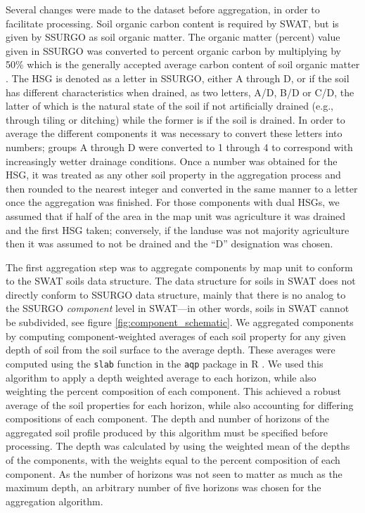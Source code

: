 Several changes were made to the dataset before aggregation, in order to
facilitate processing. Soil organic carbon content is required by SWAT, but is
given by SSURGO as soil organic matter. The organic matter (percent) value given in SSURGO
was converted to percent organic carbon by multiplying by 50\% which is the generally accepted average carbon content of soil organic matter \citep{brady_elements_2004}. The HSG is
denoted as a letter in SSURGO, either A through D, or if the soil has different
characteristics when drained, as two letters, A/D, B/D or C/D, the latter of
which is the natural state of the soil if not artificially drained (e.g.,
through tiling or ditching) while the former is if the soil is drained. In order
to average the different components it was necessary to convert these letters
into numbers; groups A through D were converted to 1 through 4 to correspond
with increasingly wetter drainage conditions. Once a number was obtained for the
HSG, it was treated as any other soil property in the aggregation process and
then rounded to the nearest integer and converted in the same manner to a letter
once the aggregation was finished. For those components with dual HSGs, we
assumed that if half of the area in the map unit was agriculture it was drained
and the first HSG taken; conversely, if the landuse was not majority agriculture
then it was assumed to not be drained and the ``D'' designation was chosen.

The first aggregation step was to aggregate components by map unit to conform to
the SWAT soils data structure. The data structure for soils in SWAT does not
directly conform to SSURGO data structure, mainly that there is no analog to the
SSURGO \textit{component} level in SWAT---in other words, soils in SWAT cannot
be subdivided, see figure \ref{fig:component_schematic}. We aggregated components by computing
component-weighted averages of each soil property for any given depth of soil from the soil surface to the average depth\cite{gatzke_aggregation_2011, beaudette_algorithms_2013}.
These averages were computed using the \texttt{slab} function in the \texttt{aqp} package in R \cite{beaudette_algorithms_2013}. We
used this algorithm to apply a depth weighted average to each horizon, while
also weighting the percent composition of each component. This achieved a robust
average of the soil properties for each horizon, while also accounting for
differing compositions of each component. The depth and number of horizons of
the aggregated soil profile produced by this algorithm must be specified before
processing. The depth was calculated by using the weighted mean of the depths of
the components, with the weights equal to the percent composition of each
component. As the number of horizons was not seen to matter as much as the
maximum depth, an arbitrary number of five horizons was chosen for the
aggregation algorithm.

